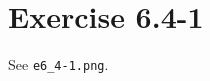 \documentclass{article}
\begin{document}
\section*{Exercise 6.4-1}

See \texttt{e6\_4-1.png}.
\end{document}

